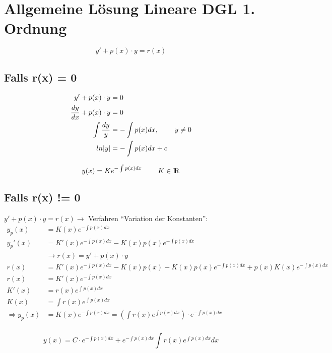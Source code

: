 \section{Allgemeine L\"osung Lineare DGL 1. Ordnung}

\begin{equation*}
    y'+p(x)\cdot y = r(x)
\end{equation*}


\subsection{Falls r(x) = 0}

\begin{align*}
    y' + p(x)\cdot y            &= 0                  \\
    \frac{dy}{dx} + p(x)\cdot y &= 0                  \\
    \int\frac{dy}{y}            &= -\int p(x)dx       ,\hspace{8mm}y \neq 0 \\
    ln\lvert y\lvert            &= -\int p(x)dx + c   \\
\end{align*}

\begin{equation*}[box=\widebox]
    y(x) = Ke^{-\int p(x)dx}       \hspace{8mm} K\in{\rm I\!R}
\end{equation*}

\subsection{Falls r(x) != 0}

$y' + p(x) \cdot y = r(x) \rightarrow$ Verfahren ``Variation der Konstanten'':
\begin{align*}
    y_p(x)             &= K(x)e^{-\int p(x)dx} \\
    y_p'(x)            &= K'(x)e^{-\int p(x)dx} - K(x)p(x)e^{-\int{p(x)dx}} \\
                       &\rightarrow r(x) = y' + p(x) \cdot y \\
    r(x)               &= K'(x)e^{-\int p(x)dx} - K(x)p(x) - K(x)p(x)e^{-\int p(x)dx} + p(x)K(x)e^{-\int p(x)dx} \\
    r(x)               &= K'(x)e^{-\int p(x)dx} \\
    K'(x)              &= r(x)e^{\int p(x)dx} \\
    K(x)               &= \int r(x)e^{\int p(x)dx} \\
    \Rightarrow y_p(x) &= K(x)e^{-\int p(x)dx} = \left(\int r(x)e^{\int p(x)dx}\right) \cdot e^{-\int p(x)dx} \\
\end{align*}

\begin{equation*}[box=\widebox]
    y(x) = C \cdot e^{-\int p(x)dx} + e^{-\int p(x)dx} \int r(x)e^{\int p(x)dx}dx
\end{equation*}


